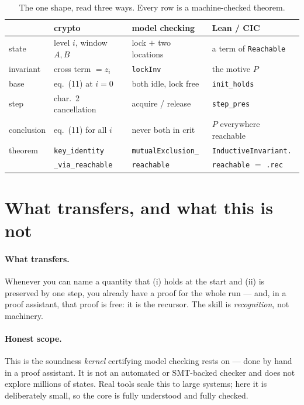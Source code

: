 \documentclass[runningheads]{llncs}
\begin{document}
\begin{table}[H]
\centering
\caption{The one shape, read three ways. Every row is a machine-checked theorem.}
\label{tab:costumes}
\renewcommand{\arraystretch}{1.25}
\small
\begin{tabular}{@{}llll@{}}
\toprule
 & \textcolor{crypto}{\textbf{crypto}} & \textcolor{mc}{\textbf{model checking}} & \textcolor{cic}{\textbf{Lean / CIC}}\\
\midrule
state      & level $i$, window $A,B$ & lock $+$ two locations & a term of \texttt{Reachable}\\
invariant  & cross term $=z_i$       & \texttt{lockInv}       & the motive $P$\\
base       & eq.~(11) at $i=0$       & both idle, lock free   & \texttt{init\_holds}\\
step       & char.~2 cancellation    & acquire / release      & \texttt{step\_pres}\\
conclusion & eq.~(11) for all $i$    & never both in crit     & $P$ everywhere reachable\\
theorem    & \texttt{key\_identity}  & \texttt{mutualExclusion\_} & \texttt{InductiveInvariant.}\\
           & \texttt{\_via\_reachable}& \texttt{reachable}     & \texttt{reachable} $=$ \texttt{.rec}\\
\bottomrule
\end{tabular}
\end{table}

\section{What transfers, and what this is not}

\paragraph{What transfers.} Whenever you can name a quantity that (i) holds at the
start and (ii) is preserved by one step, you already have a proof for the whole
run --- and, in a proof assistant, that proof is free: it is the recursor. The
skill is \emph{recognition}, not machinery.

\paragraph{Honest scope.} This is the soundness \emph{kernel} certifying model
checking rests on --- done by hand in a proof assistant. It is not an automated
or SMT-backed checker and does not explore millions of states. Real tools scale
this to large systems; here it is deliberately small, so the core is fully
understood and fully checked.
\end{document}
